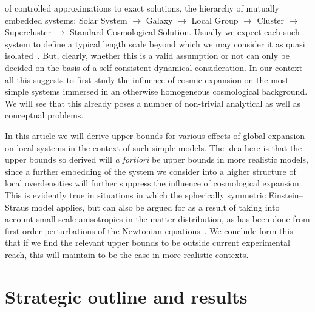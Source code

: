 \documentclass
[rmp,aps,twocolumn,showpacs,preprintnumbers,amsmath,amssymb]{revtex4}
\theoremstyle{plain}
\theoremstyle{definition}
\theoremstyle{remark}
\begin{document}
of controlled approximations to exact solutions, the hierarchy of mutually 
embedded systems: 
Solar System $\rightarrow$ Galaxy $\rightarrow$ Local Group $\rightarrow$ 
Cluster $\rightarrow$ Supercluster $\rightarrow$ Standard-Cosmological 
Solution. Usually we expect each such system to define a typical length 
scale beyond which we may consider it as quasi isolated~\cite{Cox:2007}. 
But, clearly, whether this is a valid assumption or not can only be 
decided on the basis of a self-consistent dynamical consideration.   
In our context all this suggests to first study the influence 
of cosmic expansion on the most simple systems immersed in an 
otherwise homogeneous cosmological background. We will see that 
this already poses a number of non-trivial analytical as well as 
conceptual problems. 

In this article we will derive upper bounds for various effects of global 
expansion on local systems in the context of such simple models. The idea 
here is that the upper bounds so derived will \emph{a fortiori} be upper 
bounds in more realistic models, since a further embedding of the system 
we consider into a higher structure of local overdensities will further 
suppress the influence of cosmological expansion. This is evidently true 
in situations in which the spherically symmetric Einstein--Straus model 
applies, but can also be argued for as a result of taking into account 
small-scale anisotropies in the matter distribution, as has been done 
from first-order perturbations of the Newtonian 
equations~\cite{Dominguez.Gaite:2001}. We conclude form this that if we 
find the relevant upper bounds to be outside current experimental reach, 
this will maintain to be the case in more realistic contexts. 



\section{Strategic outline and results}
\label{sec:Outline}
\end{document}
